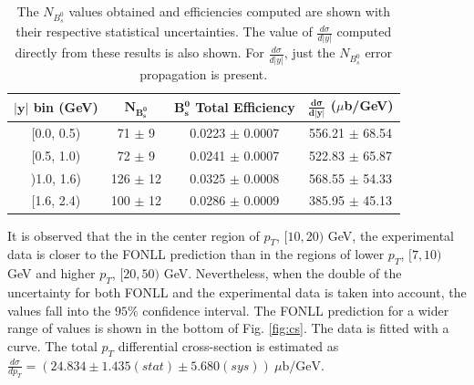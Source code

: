 \begin{table}[htbp] \begin{center}\begin{tabular}{|c|c|c|c|}\hline\textbf{$\mathbf{|y|}$ bin (GeV)} & \textbf{$\mathbf{N_{B_s^{0}}}$} & \textbf{$\mathbf{B_s^{0}}$ Total Efficiency} & \textbf{${\mathbf{\frac{d \sigma}{d|y|}}}$ ($\mu$b/GeV)} \\\hline{[}0.0, 0.5{)} &  71  $\pm$  9 &   0.0223  $\pm$  0.0007 &   556.21  $\pm$  68.54 \\{[}0.5, 1.0{)} &  72  $\pm$  9 &   0.0241  $\pm$  0.0007 &   522.83  $\pm$  65.87 \\{)}1.0, 1.6{)} &  126  $\pm$  12 &   0.0325  $\pm$  0.0008 &   568.55  $\pm$  54.33 \\{[}1.6, 2.4{)} &  100  $\pm$  12 &   0.0286  $\pm$  0.0009 &   385.95  $\pm$  45.13 \\\hline\end{tabular}\caption{The $N_{B_s^{0}}$ values obtained and efficiencies computed are shown with their respective statistical uncertainties. The value of ${\frac{d \sigma}{d|y|}}$ computed directly from these results is also shown. For ${\frac{d \sigma}{d|y|}}$, just the $N_{B_s^{0}}$ error propagation is present.}\label{table:result_raw_fdfu_y}\end{center}\end{table}


It is observed that the in the center region of $p_T$, $[10, 20)$ GeV, the experimental data is closer to the FONLL prediction than in the regions of lower $p_T$, $[7, 10)$ GeV and higher $p_T$, $[20, 50)$ GeV. Nevertheless, when the double of the uncertainty for both FONLL and the experimental data is taken into account, the values fall into the $95\%$ \cite{vsirca2016probability} confidence interval. The FONLL prediction for a wider range of values is shown in the bottom of Fig. \ref{fig:cs}. The data is fitted with a curve. The total $p_T$ differential cross-section is estimated as $\frac{d \sigma}{dp_T} = (24.834 \pm 1.435(stat) \pm 5.680(sys)) \ \mu\text{b}/\text{GeV}$.

